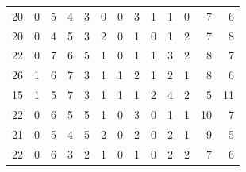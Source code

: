 \begin{table}[]
\begin{tabular}{rrrrrrrrrrrrr}
		20 & 0 & 5 & 4 & 3 & 0 & 0 & 3 & 1 & 1 & 0 & 7 & 6 \\
		20 & 0 & 4 & 5 & 3 & 2 & 0 & 1 & 0 & 1 & 2 & 7 & 8 \\
		22 & 0 & 7 & 6 & 5 & 1 & 0 & 1 & 1 & 3 & 2 & 8 & 7 \\
		26 & 1 & 6 & 7 & 3 & 1 & 1 & 2 & 1 & 2 & 1 & 8 & 6 \\
		15 & 1 & 5 & 7 & 3 & 1 & 1 & 1 & 2 & 4 & 2 & 5 & 11 \\
		22 & 0 & 6 & 5 & 5 & 1 & 0 & 3 & 0 & 1 & 1 & 10 & 7 \\
		21 & 0 & 5 & 4 & 5 & 2 & 0 & 2 & 0 & 2 & 1 & 9 & 5 \\
		22 & 0 & 6 & 3 & 2 & 1 & 0 & 1 & 0 & 2 & 2 & 7 & 6
	\end{tabular}
\end{table}

